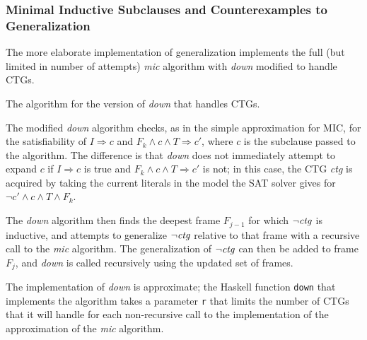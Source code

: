 \documentclass[12pt,a4paper,twoside,openright]{report}
\begin{document}
{\subsubsection{Minimal Inductive Subclauses and Counterexamples to Generalization}
The more elaborate implementation of generalization implements the full
(but limited in number of attempts) {\it mic} algorithm with {\it down} modified
to handle CTGs.

\begin{algorithm}[!Ht]
\DontPrintSemicolon
{}
\caption{The algorithm for the version of {\it down} that handles CTGs.}
\label{mic}
\end{algorithm}

The modified {\it down} algorithm checks, as in the simple approximation for MIC, for the satisfiability of
$I \Rightarrow c$ and $F_k \wedge c \wedge T \Rightarrow c'$, where $c$ is the subclause passed to
the algorithm.
The difference is that {\it down} does not immediately attempt to expand $c$
if $I \Rightarrow c$ is true and $F_k \wedge c \wedge T \Rightarrow c'$ is
not; in this case, the CTG {\it ctg} is acquired by taking the current literals in
the model the SAT solver gives for $\neg c' \wedge c \wedge T \wedge F_k$.

The {\it down} algorithm then finds the deepest frame $F_{j - 1}$ for which $\neg {\it ctg}$ is inductive,
and attempts to generalize $\neg {\it ctg}$ relative to that frame with a recursive call to the
{\it mic} algorithm. The generalization of $\neg {\it ctg}$ can then be added to frame $F_j$,
and {\it down} is called recursively using the updated set of frames.

The implementation of {\it down} is approximate; the Haskell function \verb,down, that implements
the algorithm takes a parameter \verb,r, that limits the number of CTGs that it will handle for
each non-recursive call to the implementation of the approximation of the {\it mic} algorithm.

}
\end{document}
